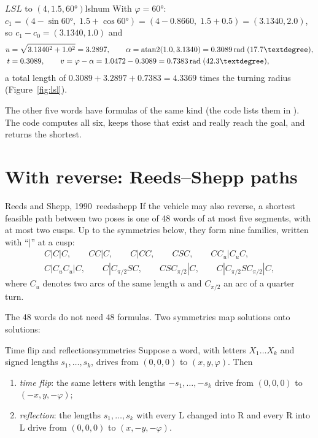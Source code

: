 \begin{example}{$LSL$ to $(4, 1.5, 60°)$}{lslnum}
  With $\varphi = 60°$: $c_1 = (4 - \sin 60°,\; 1.5 + \cos 60°) = (4 -
  0.8660,\; 1.5 + 0.5) = (3.1340, 2.0)$, so $c_1 - c_0 = (3.1340, 1.0)$ and
  \begin{align*}
    u &= \sqrt{3.1340^2 + 1.0^2} = 3.2897, \qquad
    \alpha = \atantwo(1.0, 3.1340) = \SI{0.3089}{\radian}\;(17.7°), \\
    t &= 0.3089, \qquad v = \varphi - \alpha = 1.0472 - 0.3089
      = \SI{0.7383}{\radian}\;(42.3°),
  \end{align*}
  a total length of $0.3089 + 3.2897 + 0.7383 = 4.3369$ times the turning
  radius (Figure~\ref{fig:lsl}).
\end{example}

The other five words have formulas of the same kind (the code lists them in
). The code computes all six, keeps those that exist and
really reach the goal, and returns the shortest.

\section{With reverse: Reeds--Shepp paths}

\begin{theorem}{Reeds and Shepp, 1990~\cite{reeds1990optimal}}{reedsshepp}
  If the vehicle may also reverse, a shortest feasible path between two poses
  is one of 48 words of at most five segments, with at most two cusps. Up to
  the symmetries below, they form nine families, written with ``$|$'' at a
  cusp:
  \begin{gather*}
    C|C|C,\qquad CC|C,\qquad C|CC,\qquad CSC,\qquad CC_u|C_uC,\\
    C|C_uC_u|C,\qquad C|C_{\pi/2}SC,\qquad CSC_{\pi/2}|C,\qquad
    C|C_{\pi/2}SC_{\pi/2}|C,
  \end{gather*}
  where $C_u$ denotes two arcs of the same length $u$ and $C_{\pi/2}$ an arc
  of a quarter turn.
\end{theorem}

The 48 words do not need 48 formulas. Two symmetries map solutions onto
solutions:

\begin{proposition}{Time flip and reflection}{symmetries}
  Suppose a word, with letters $X_1 \dots X_k$ and signed lengths $s_1, \dots,
  s_k$, drives from $(0, 0, 0)$ to $(x, y, \varphi)$. Then
  \begin{enumerate}
    \item \emph{time flip}: the same letters with lengths $-s_1, \dots,
      -s_k$ drive from $(0, 0, 0)$ to $(-x, y, -\varphi)$;
    \item \emph{reflection}: the lengths $s_1, \dots, s_k$ with every L
      changed into R and every R into L drive from $(0, 0, 0)$ to
      $(x, -y, -\varphi)$.
  \end{enumerate}
\end{proposition}

